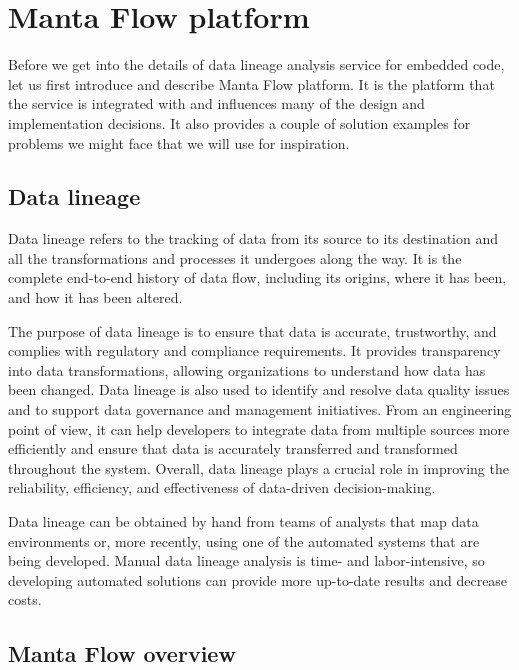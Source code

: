 \chapter{Manta Flow platform}

Before we get into the details of data lineage analysis service for embedded code, let us first introduce and describe Manta Flow platform. It is the platform that the service is integrated with and influences many of the design and implementation decisions. It also provides a couple of solution examples for problems we might face that we will use for inspiration.

\section{Data lineage}

Data lineage refers to the tracking of data from its source to its destination and all the transformations and processes it undergoes along the way. It is the complete end-to-end history of data flow, including its origins, where it has been, and how it has been altered.
\par
The purpose of data lineage is to ensure that data is accurate, trustworthy, and complies with regulatory and compliance requirements. It provides transparency into data transformations, allowing organizations to understand how data has been changed. Data lineage is also used to identify and resolve data quality issues and to support data governance and management initiatives. From an engineering point of view, it can help developers to integrate data from multiple sources more efficiently and ensure that data is accurately transferred and transformed throughout the system. Overall, data lineage plays a crucial role in improving the reliability, efficiency, and effectiveness of data-driven decision-making.
\par
Data lineage can be obtained by hand from teams of analysts that map data environments or, more recently, using one of the automated systems that are being developed. Manual data lineage analysis is time- and labor-intensive, so developing automated solutions can provide more up-to-date results and decrease costs.

\section{Manta Flow overview}

